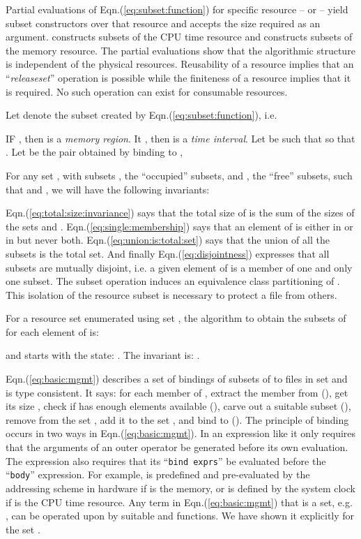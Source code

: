 \documentclass[draft]{article}
\def\eqn#1{Eqn.(\ref{#1})}
\begin{document}
Partial evaluations of  \eqn{eq:subset:function} for specific resource
--   or   -- yield  subset constructors  over that  resource and
accepts the size required as an argument.   constructs
subsets  of the  CPU time  resource  and   constructs
subsets of the memory resource.  The partial evaluations show that the
algorithmic  structure  is  independent  of  the  physical  resources.
Reusability  of  a  resource  implies  that  an  ``\emph{releaseset}''
operation is possible while the  finiteness of a resource implies that
it is required.  No such operation can exist for consumable resources.

Let  denote the subset created by \eqn{eq:subset:function}, i.e.

IF , then  is a \emph{memory region}.  It ,
then   is a \emph{time interval}.   Let   be such that  so that  .  Let  be the pair obtained by binding  to ,

For any  set ,  with subsets ,  the ``occupied''  subsets, and
, the ``free'' subsets, such that   and , we will have the following invariants:

\eqn{eq:total:size:invariance} says that the  total size of  is the
sum    of    the   sizes    of    the    sets       and    .
\eqn{eq:single:membership} says  that an element  of  is  either in
 or  in   but never both.   \eqn{eq:union:is:total:set} says
that  the union  of all  the subsets  is the  total set.   And finally
\eqn{eq:disjointness}   expresses  that   all  subsets   are  mutually
disjoint, i.e. a given element of   is a member of one and only one
subset.    The   subset  operation   induces   an  equivalence   class
partitioning  of  .   This  isolation  of the  resource  subset  is
necessary to protect a file from others.

For  a resource set   enumerated  using set  , the  algorithm to
obtain the subsets of  for each element of  is:

and starts  with the state:  .  The
invariant  is: .

\eqn{eq:basic:mgmt} describes a  set of bindings of subsets  of  to
files in set  and is  type consistent.  It says: for each member of
, extract the member from   (), get its size ,
check if  has enough  elements available (), carve
out a  suitable subset  (),  remove  from
the  set ,  add it  to the  set ,  and bind    to 
().   The principle of  binding occurs in two  ways in
\eqn{eq:basic:mgmt}.  In  an expression like  
it only requires that the  arguments of an outer operator be generated
before its  own evaluation.  The   expression also  requires that
its ``\texttt{bind exprs}''  be evaluated before the ``\texttt{body}''
expression.  For  example,   is predefined and  pre-evaluated by
the addressing scheme in hardware if   is the memory, or is defined
by the  system clock  if  is  the CPU  time resource.  Any  term in
\eqn{eq:basic:mgmt} that is  a set, e.g.  , can  be operated upon
by suitable   and  functions.  We have  shown it explicitly
for the set .
 
\end{document}

